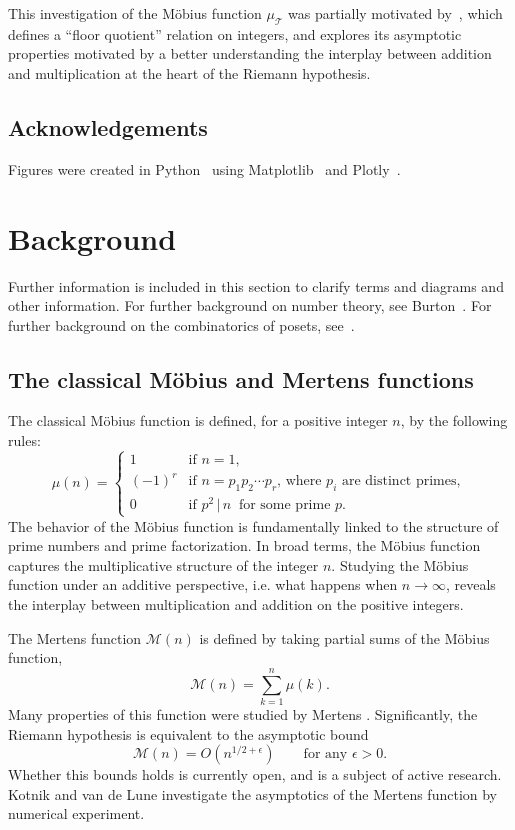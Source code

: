 \documentclass{amsart}
\theoremstyle{definition}
\newcommand{\Mobius}{M\"obius}
\newcommand{\mutri}{\mu_{\tri}}
\newcommand{\tri}{\mathcal T}
\newcommand{\mertens}{\mathcal M}
\begin{document}
This investigation of the \Mobius{} function $\mutri$ was partially motivated by~\cite{lagarias-richman},
which defines a ``floor quotient'' relation on integers, and explores its asymptotic properties motivated by a better understanding the interplay between addition and multiplication at the heart of the Riemann hypothesis.

\subsection*{Acknowledgements}

Figures were created in Python~\cite{python} using Matplotlib~\cite{matplotlib} and Plotly~\cite{plotly}.

\section{Background}

Further information is included in this section to clarify terms and diagrams and other information. 
For further background on number theory, see Burton~\cite{Burton}.
For further background on the combinatorics of posets, see~\cite{Bona}.

\subsection{The classical \Mobius{} and Mertens functions}




The classical \Mobius{} function \cite{mobius} is defined, for a positive integer $n$, by the following rules:
\[
\mu(n) = \begin{cases}
    1 &\text{if } n = 1,\\
    (-1)^r &\text{if $n = p_1 p_2 \cdots p_r$, where $p_i$ are distinct primes},\\
    0 &\text{if } p^2 \,|\, n ~ \text{ for some prime }p.
\end{cases}
\]
The behavior of the \Mobius{} function is fundamentally linked to the structure of prime numbers and prime factorization.
In broad terms, the \Mobius{} function captures the multiplicative structure of the integer $n$. 
Studying the \Mobius{} function under an additive perspective, i.e. what happens when $n \to \infty$, reveals the interplay between multiplication and addition on the positive integers.


The Mertens function $\mertens(n)$ is defined by taking partial sums of the \Mobius{} function,
\[
    \mertens(n) = \sum_{k = 1}^n \mu(k).
\]
Many properties of this function were studied by Mertens \cite{mertens}.
Significantly, the Riemann hypothesis is equivalent to the asymptotic bound 
\[
    \mertens(n) = O(n^{1/2 + \epsilon}) \qquad\text{for any } \epsilon > 0.
\]
Whether this bounds holds is currently open, and is a subject of active research.
Kotnik and van de Lune
\cite{kotnik-vandelune}
investigate the asymptotics of the Mertens function by numerical experiment.
\end{document}
